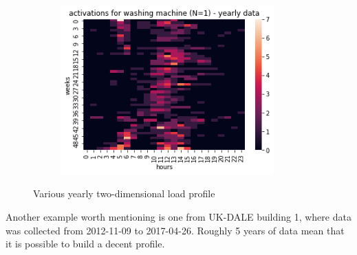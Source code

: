 \begin{figure}[H]
\begin{subfigure}{.32\textwidth}
		\includegraphics[width=0.9\textwidth]{../Figures/LPS/HM_Ywh_wm.png}
		\label{fig:HM_Ywh_wm}
	\end{subfigure}%
	\label{fig:var_2d_lps}
	\caption{Various yearly two-dimensional load profile}
\end{figure}

Another example worth mentioning is one from UK-DALE building 1, where data was collected from 2012-11-09 to 2017-04-26.
Roughly 5 years of data mean that it is possible to build a decent profile. 

